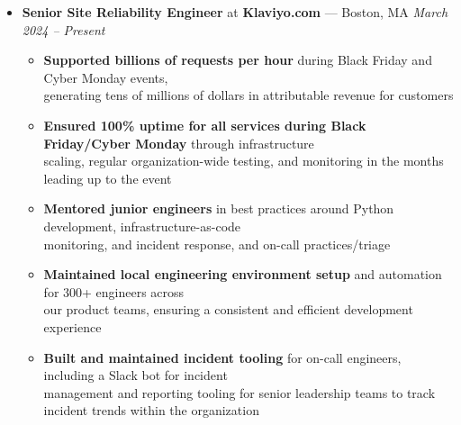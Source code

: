 \documentclass{article}
\begin{document}
\begin{itemize}[label={},leftmargin=*]

  \item \textbf{Senior Site Reliability Engineer} at \textbf{Klaviyo.com} --- Boston, MA \hfill {\em March 2024 -- Present}
  \begin{itemize}[label={$\bullet$}]
    \item \textbf{Supported billions of requests per hour} during Black Friday and Cyber Monday events,\\
          generating tens of millions of dollars in attributable revenue for customers
    \item \textbf{Ensured 100\% uptime for all services during Black Friday/Cyber Monday} through infrastructure\\
          scaling, regular organization-wide testing, and monitoring in the months leading up to the event
    \item \textbf{Mentored junior engineers} in best practices around Python development, infrastructure-as-code\\
          monitoring, and incident response, and on-call practices/triage
    \item \textbf{Maintained local engineering environment setup} and automation for 300+ engineers across\\
          our product teams, ensuring a consistent and efficient development experience
    \item \textbf{Built and maintained incident tooling} for on-call engineers, including a Slack bot for incident\\
          management and reporting tooling for senior leadership teams to track incident trends within the organization
  \end{itemize}


\end{itemize}
\end{document}
